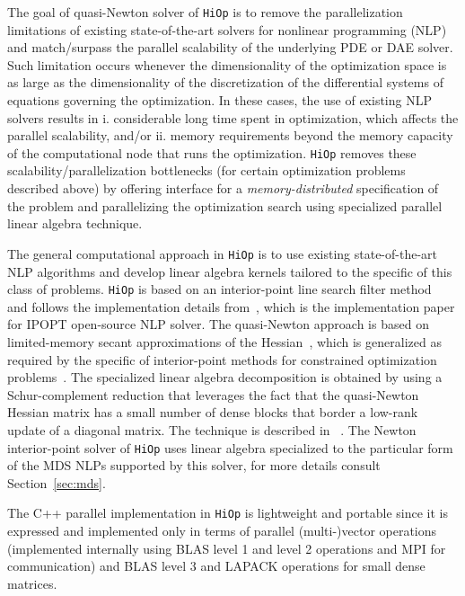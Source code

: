 \documentclass[11pt]{article}
\newcounter{line}
\newcommand{\Hi}{\texttt{HiOp}\xspace}
\begin{document}
The goal of quasi-Newton solver of \Hi is to remove the parallelization limitations of existing state-of-the-art solvers for nonlinear programming (NLP) and match/surpass the parallel scalability of the underlying PDE or DAE solver. Such limitation occurs whenever the dimensionality of the optimization space  is as large as the dimensionality of the discretization of the differential systems of equations governing the optimization. In these cases, the use of existing NLP solvers  results in i. considerable long time spent in optimization, which affects the parallel scalability, and/or ii. memory requirements beyond the memory capacity of the computational node that runs the optimization. \Hi removes these scalability/parallelization bottlenecks (for certain optimization problems described above) by offering interface for a \textit{memory-distributed} specification of the problem and parallelizing the optimization search using specialized parallel linear algebra technique.

The general computational approach in \Hi is to use existing state-of-the-art NLP algorithms and develop linear algebra kernels tailored to the specific of this
class of problems. \Hi is based on an interior-point line search filter method~\cite{waecther_05_ipopt2,waecther_05_ipopt} and follows the implementation details from~\cite{waecther_05_ipopt0}, which is the implementation paper for IPOPT open-source NLP solver. The quasi-Newton approach is based on limited-memory secant approximations of the Hessian~\cite{ByrdNocedalSchnabel_94_quasiNewtonRepres}, which is generalized as required by the specific of interior-point methods for constrained optimization problems~\cite{petra_hiop}. The specialized linear algebra decomposition is obtained by using a Schur-complement reduction that
leverages the fact that the quasi-Newton Hessian matrix has a small number of
dense blocks that border a low-rank update of a diagonal matrix. The technique is described  in ~\cite{petra_hiop}. The Newton interior-point solver of \Hi uses linear algebra specialized to the particular form of the MDS NLPs supported by this solver, for more details consult Section~\ref{sec:mds}. 

The C++ parallel implementation in \Hi
is  lightweight and portable since it is expressed and implemented  only in terms of parallel (multi-)vector operations (implemented internally using BLAS level 1 and level 2 operations and MPI for communication) and BLAS level 3 and LAPACK operations for small dense matrices.
\end{document}
